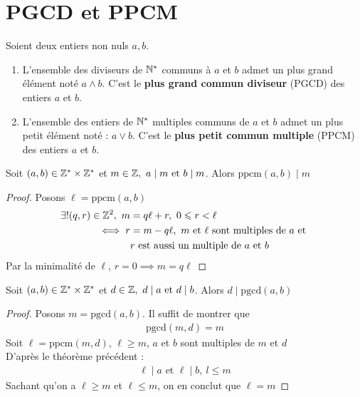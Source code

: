 \section{PGCD et PPCM}
\begin{graybox}
\begin{definition}
Soient deux entiers non nuls $a, b$.
\begin{enumerate}
\item L'ensemble des diviseurs de $\mathbb{N}^*$ communs à $a$ et $b$ admet un plus grand élément noté $a \wedge b$. C'est le \textbf{plus grand commun diviseur} (PGCD) des entiers $a$ et $b$.
\item L'ensemble des entiers de $\mathbb{N}^*$ multiples communs de $a$ et $b$ admet un plus petit élément noté : $a \vee b$. C'est le \textbf{plus petit commun multiple} (PPCM) des entiers $a$ et $b$.
\end{enumerate}
\end{definition}
\end{graybox}

\begin{graybox}
\begin{theoreme}[PPCM]
Soit $(a, b) \in \mathbb{Z}^* \times \mathbb{Z}^*$ et $m \in \mathbb{Z},\ a \mid m \text{ et } b \mid m$. Alors $\mathrm{ppcm}(a, b) \mid m$
\end{theoreme}
\end{graybox}

\begin{proof}
Posons $\ell = \mathrm{ppcm}(a, b)$
\begin{align*}
\exists ! (q, r) \in \mathbb{Z}^2, \ m &= q\ell + r,\ 0 \leqslant r < \ell \\
\iff r &= m - q\ell,\ m \text{ et } \ell \text{ sont multiples de } a \text{ et } 
\\
&r \text{ est aussi un multiple de } a \text{ et } b
\end{align*}
Par la minimalité de $\ell$, $r = 0 \implies m = q \ell$
\end{proof}

\begin{graybox}
\begin{theoreme}[PGCD]
Soit $(a, b) \in \mathbb{Z}^* \times \mathbb{Z}^*$ et $d \in \mathbb{Z},\ d \mid a \text{ et } d \mid b$. Alors $d \mid \mathrm{pgcd}(a, b)$
\end{theoreme}
\end{graybox}

\begin{proof}
Posons $m = \mathrm{pgcd}(a, b)$. Il suffit de montrer que 
\begin{align*}
\mathrm{pgcd}(m, d) = m
\end{align*}
Soit $\ell = \mathrm{ppcm}(m ,d)$, $\ell \geq m$, $a$ et $b$ sont multiples de $m$ et $d$
\\
D'après le théorème précédent : 
\begin{align*}
\ell \mid a \text{ et } \ell \mid b, \ l \leq m
\end{align*}
Sachant qu'on a $\ell \geq m$ et $\ell \leq m$, on en conclut que $\ell = m$
\end{proof}

